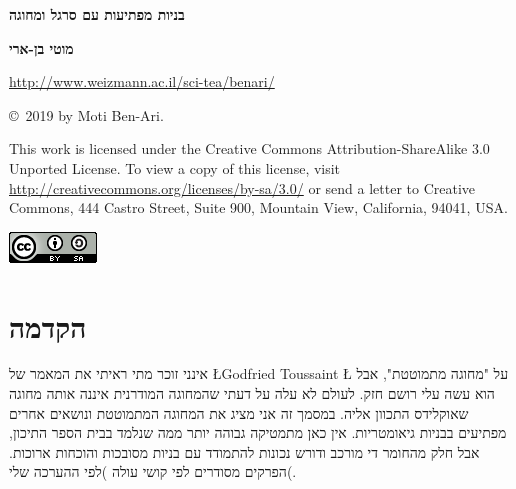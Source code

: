 

\thispagestyle{empty}

\begin{center}
\textbf{\LARGE בניות מפתיעות עם סרגל ומחוגה}

\bigskip
\bigskip
\bigskip
\bigskip

\textbf{\Large מוטי בן-ארי}

\bigskip
\bigskip

\url{http://www.weizmann.ac.il/sci-tea/benari/}
\end{center}



\vfill


\begin{footnotesize}
\begin{center}
\copyright{}\ 2019 by Moti Ben-Ari.
\end{center}

This work is licensed under the Creative Commons Attribution-ShareAlike 3.0 Unported License. To view a copy of this license, visit \url{http://creativecommons.org/licenses/by-sa/3.0/} or send a letter to Creative Commons, 444 Castro Street, Suite 900, Mountain View, California, 94041, USA.
\end{footnotesize}

\bigskip

\begin{center}
\includegraphics[width=.15\textwidth]{../../by-sa.png}
\end{center}

\np
\thispagestyle{empty}
\mbox{}
\np
\thispagestyle{empty}

\tableofcontents
\np
\mbox{}
\np

\section*{הקדמה}

אינני זוכר מתי ראיתי את המאמר של 
\L{Godfried Toussaint}
\L{\cite{toussaint}}
על "מחוגה מתמוטטת", אבל הוא עשה עלי רושם חזק. לעולם לא עלה על דעתי שהמחוגה המודרנית איננה אותה מחוגה שאוקלידס התכוון אליה. במסמך זה אני מציג את המחוגה המתמוטטת ונושאים אחרים מפתיעים בבניות גיאומטריות. אין כאן מתמטיקה גבוהה יותר ממה שנלמד בבית הספר התיכון, אבל חלק מהחומר די מורכב ודורש נכונות להתמודד עם בניות מסובכות והוכחות ארוכות. הפרקים מסודרים לפי קושי עולה )לפי ההערכה שלי(.

